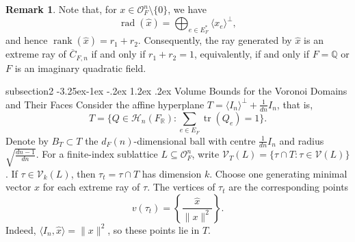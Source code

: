 \documentclass[11pt,a4paper,twoside]{amsart}
\makeatletter
\renewcommand{\subsection}{\@startsection
  {subsection}{2}{\z@}%
  {-3.25ex\@plus -1ex \@minus -.2ex}%
  {1.2ex \@plus .2ex}%
  {\normalfont\bfseries}}
\theoremstyle{plain}
\theoremstyle{definition}
\newtheorem{remark}[theorem]{\bfseries Remark}
\newcommand{\rint}[0]{\mathcal{O}_F}
\newcommand{\Her}[0]{\mathcal{H}_n(\fr)}
\newcommand{\fr}[0]{F_\mathbb{R}}
\makeatother
\begin{document}
\begin{remark} \label{interior_min_points}
   Note that, for $x\in\rint^n\setminus\{ 0\}$, we have
$$
\operatorname{rad}(\hat{x})=\bigoplus_{e\in E^*_F}\langle x_e\rangle^\perp,
$$
and hence $\operatorname{rank}(\hat{x})=r_1+r_2$. Consequently, the ray generated by $\hat{x}$ is an extreme ray
of $\overline{C}_{F,n}$ if and only if $r_1+r_2=1$,
equivalently, if and only if $F=\mathbb{Q}$ or $F$ is
an imaginary quadratic field.
\end{remark}

\subsection{Volume Bounds for the Voronoi Domains and Their Faces}
Consider the affine hyperplane $T=\langle I_n\rangle^\perp+\frac{1}{dn}I_n$, that is,
$$T=\{Q\in\Her:\sum_{e\in E_F}\operatorname{tr}(Q_e)=1\}.$$
Denote by $B_T\subset T$ the $d_F(n)$-dimensional ball with centre $\frac{1}{dn}I_n$ and radius $\sqrt{\frac{dn-1}{dn}}$. For a finite-index sublattice $L\subseteq\rint^n$, write $\mathcal V_T(L)=\{\tau\cap T:\tau\in\mathcal V(L)\}$. If $\tau\in\mathcal V_k(L)$, then $\tau_t=\tau\cap T$ has dimension $k$. Choose one generating minimal vector $x$ for each extreme ray of $\tau$. The vertices of $\tau_t$ are the corresponding points
$$v(\tau_t)=\left\{\frac{\hat x}{\|x\|^2}\right\}.$$
Indeed, $\langle I_n,\hat x\rangle=\|x\|^2$, so these points lie in $T$.
\end{document}
